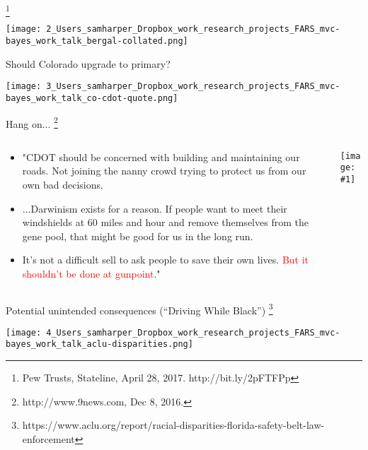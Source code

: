 \documentclass[english]{beamer}\usepackage[]{graphicx}\usepackage[]{color}
\newcommand{\figw}[2]{\centerline{\texttt{[image: \#1]}}}
\begin{document}
%
\begin{frame}{}
\footnote{{\tiny{}Pew Trusts, Stateline, April 28, 2017. http://bit.ly/2pFTFPp}}
\begin{center}
\texttt{[image: 2\_Users\_samharper\_Dropbox\_work\_research\_projects\_FARS\_mvc-bayes\_work\_talk\_bergal-collated.png]}
\par\end{center}

\end{frame}
%
\begin{frame}[plain]{Should Colorado upgrade to primary?}
\begin{center}
\texttt{[image: 3\_Users\_samharper\_Dropbox\_work\_research\_projects\_FARS\_mvc-bayes\_work\_talk\_co-cdot-quote.png]}
\par\end{center}

\end{frame}
%
\begin{frame}{Hang on...}
\footnote{http://www.9news.com, Dec 8, 2016.}


\begin{columns}
    \begin{column}{0.6\textwidth}
        \begin{itemize}
            \item[] "CDOT should be concerned with building and maintaining our roads. Not joining the nanny crowd trying to protect us from our own bad decisions. \medskip{}
            \item[] ...Darwinism exists for a reason. If people want to meet their windshields at 60 miles and hour and remove themselves from the gene pool, that might be good for us in the long run. \medskip{}
            \item[] It's not a difficult sell to ask people to save their own lives. \textcolor{red}{But it shouldn't be done at gunpoint}."
        \end{itemize}
    \end{column}
    \begin{column}{0.4\textwidth}
        \figw{co-concerned.png}{.9}
    \end{column}
\end{columns}
\end{frame}
%
\begin{frame}{Potential unintended consequences (``Driving While Black'')}
\footnote{{\tiny{}https://www.aclu.org/report/racial-disparities-florida-safety-belt-law-enforcement}}
\begin{center}
\texttt{[image: 4\_Users\_samharper\_Dropbox\_work\_research\_projects\_FARS\_mvc-bayes\_work\_talk\_aclu-disparities.png]}
\par\end{center}

\end{frame}
\end{document}

